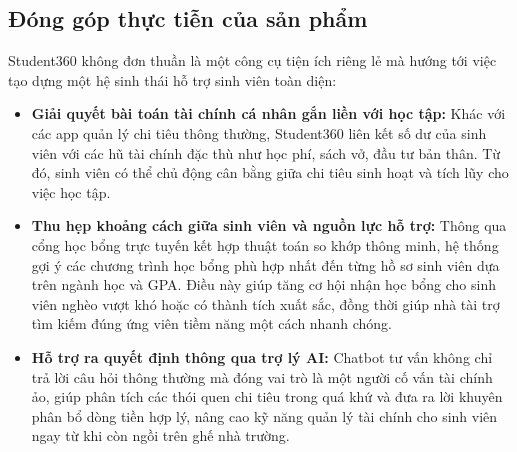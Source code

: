 \subsection{Đóng góp thực tiễn của sản phẩm}
Student360 không đơn thuần là một công cụ tiện ích riêng lẻ mà hướng tới việc tạo dựng một hệ sinh thái hỗ trợ sinh viên toàn diện:
\begin{itemize}
    \item \textbf{Giải quyết bài toán tài chính cá nhân gắn liền với học tập:} Khác với các app quản lý chi tiêu thông thường, Student360 liên kết số dư của sinh viên với các hũ tài chính đặc thù như học phí, sách vở, đầu tư bản thân. Từ đó, sinh viên có thể chủ động cân bằng giữa chi tiêu sinh hoạt và tích lũy cho việc học tập.
    \item \textbf{Thu hẹp khoảng cách giữa sinh viên và nguồn lực hỗ trợ:} Thông qua cổng học bổng trực tuyến kết hợp thuật toán so khớp thông minh, hệ thống gợi ý các chương trình học bổng phù hợp nhất đến từng hồ sơ sinh viên dựa trên ngành học và GPA. Điều này giúp tăng cơ hội nhận học bổng cho sinh viên nghèo vượt khó hoặc có thành tích xuất sắc, đồng thời giúp nhà tài trợ tìm kiếm đúng ứng viên tiềm năng một cách nhanh chóng.
    \item \textbf{Hỗ trợ ra quyết định thông qua trợ lý AI:} Chatbot tư vấn không chỉ trả lời câu hỏi thông thường mà đóng vai trò là một người cố vấn tài chính ảo, giúp phân tích các thói quen chi tiêu trong quá khứ và đưa ra lời khuyên phân bổ dòng tiền hợp lý, nâng cao kỹ năng quản lý tài chính cho sinh viên ngay từ khi còn ngồi trên ghế nhà trường.
\end{itemize}


